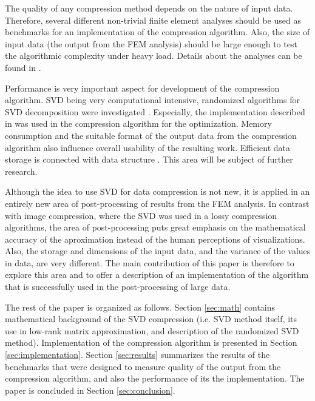 The quality of any compression method depends on the nature of input data. Therefore, several different non-trivial finite element analyses should be used as benchmarks for an implementation of the compression algorithm. Also, the size of input data (the output from the FEM analysis) should be large enough to test the algorithmic complexity under heavy load. Details about the analyses can be found in \cite{Kruis2012, Koudelka2009, Koudelka2006, Kruis2005}.

Performance is very important aspect for development of the compression algorithm. SVD being very computational intensive, randomized algorithms for SVD decomposition were investigated \cite{Candes2011, Woolfe2008, Martinsson2011, Szlam2014}. Especially, the implementation described in \cite{Halko2011} was used in the compression algorithm for the optimization. Memory consumption and the suitable format of the output data from the compression algorithm also influence overall usability of the resulting work. Efficient data storage is connected with data structure \cite{Ivanyi2012, Ivanyi2014}. This area will be subject of further research.

Although the idea to use SVD for data compression is not new, it is applied in an entirely new area of post-processing of results from the FEM analysis. In contrast with image compression, where the SVD was used in a lossy compression algorithms, the area of post-processing puts great emphasis on the mathematical accuracy of the aproximation instead of the human perceptions of visualizations. Also, the storage and dimensions of the input data, and the variance of the values in data, are very different. The main contribution of this paper is therefore to explore this area and to offer a description of an implementation of the algorithm that is successfully used in the post-processing of large data.

The rest of the paper is organized as follows. Section \ref{sec:math} contains mathematical background of the SVD compression (i.e. SVD method itself, its use in low-rank matrix approximation, and description of the randomized SVD method). Implementation of the compression algorithm is presented in Section \ref{sec:implementation}. Section \ref{sec:results} summarizes the results of the benchmarks that were designed to measure quality of the output from the compression algorithm, and also the performance of its the implementation. The paper is concluded in Section \ref{sec:conclusion}.
